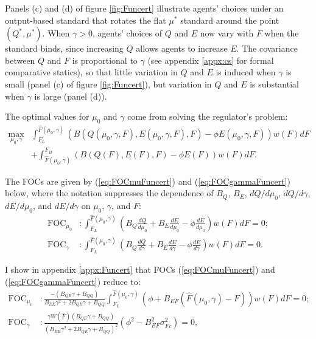 \documentclass[12pt]{article}
\begin{document}
Panels (c) and (d) of figure \ref{fig:Funcert} illustrate agents' choices under an output-based standard that rotates the flat $\mu^*$ standard around the point $(Q^*,\mu^*)$. When $\gamma>0$, agents' choices of $Q$ and $E$ now vary with $F$ when the standard binds, since increasing $Q$ allows agents to increase $E$. The covariance between $Q$ and $F$ is proportional to $\gamma$ (see appendix \ref{appx:cs} for formal comparative statics), so that little variation in $Q$ and $E$ is induced when $\gamma$ is small (panel (c) of figure \ref{fig:Funcert}), but variation in $Q$ and $E$ is substantial when $\gamma$ is large (panel (d)).

The optimal values for $\mu_0$ and $\gamma$ come from solving the regulator's problem:
\begin{align}
\max_{\mu_0,\gamma} &\int_{F_L}^{\hat{F}(\mu_0,\gamma)}\left(B(Q(\mu_0,\gamma,F),E(\mu_0,\gamma,F),F)-\phi E(\mu_0,\gamma,F)\right)w(F)dF \nonumber \\
&+ \int_{\hat{F}(\mu_0,\gamma)}^{F_H}\left(B(Q(F),E(F),F)-\phi E(F)\right)w(F)dF. \label{eq:RegProbFuncert}
\end{align}

The FOCs are given by (\ref{eq:FOCmuFuncert}) and (\ref{eq:FOCgammaFuncert}) below, where the notation suppresses the dependence of $B_Q$, $B_E$, $dQ/d\mu_0$, $dQ/d\gamma$, $dE/d\mu_0$, and $dE/d\gamma$ on $\mu_0$, $\gamma$, and $F$:
\begin{align}
\text{FOC}_{\mu_0}&:\int_{F_L}^{\hat{F}(\mu_0,\gamma)}\left(B_Q\frac{dQ}{d\mu_0} +B_E\frac{dE}{d\mu_0} -\phi\frac{dE}{d\mu_0}\right)w(F)dF = 0; \label{eq:FOCmuFuncert} \\
\text{FOC}_{\gamma}&:\int_{F_L}^{\hat{F }(\mu_0,\gamma)}\left(B_Q\frac{dQ}{d\gamma} +B_E\frac{dE}{d\gamma} -\phi\frac{dE}{d\gamma}\right)w(F)dF = 0. \label{eq:FOCgammaFuncert}
\end{align}

I show in appendix \ref{appx:Funcert} that FOCs (\ref{eq:FOCmuFuncert}) and (\ref{eq:FOCgammaFuncert}) reduce to:
\begin{align}
\text{FOC}_{\mu_0}&:\frac{-(B_{QE}\gamma+B_{QQ})}{B_{EE}\gamma^2+2B_{QE}\gamma+B_{QQ}} \int_{F_L}^{\hat{F}(\mu_0,\gamma)}\left(\phi+B_{EF}(\hat{F}(\mu_0,\gamma)-F)\right)w(F)dF=0; \label{eq:FOCmu2Funcert} \\
\text{FOC}_{\gamma}&:\frac{\gamma W(\hat{F})(B_{QE}\gamma+B_{QQ})}{(B_{EE}\gamma^2+2B_{QE}\gamma+B_{QQ})^2}(\phi^2-B_{EF}^2\sigma_{Fc}^2)=0, \label{eq:FOCgamma2Funcert}
\end{align}
\end{document}
